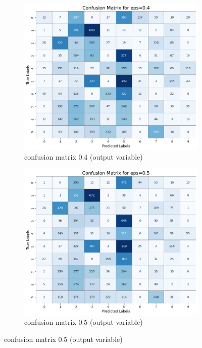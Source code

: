 \documentclass[11pt,onside]{article}
\begin{document}
\begin{figure}[h]
  \centering
  \begin{subfigure}[b]{0.49\textwidth}
    \centering
    \includegraphics[width=\textwidth]{V2_images/_correct_labels_confusion_matrix_eps_0.4.png}
    \caption{confusion matrix 0.4 (output variable)}
    \label{fig:image1}
  \end{subfigure}
  \hfill
  \begin{subfigure}[b]{0.49\textwidth}
    \centering
    \includegraphics[width=\textwidth]{V2_images/_correct_labels_confusion_matrix_eps_0.5.png}
    \caption{confusion matrix 0.5 (output variable)}
    \label{fig:image2}
  \end{subfigure}
 
  \label{fig:images}
\end{figure}
\end{document}

